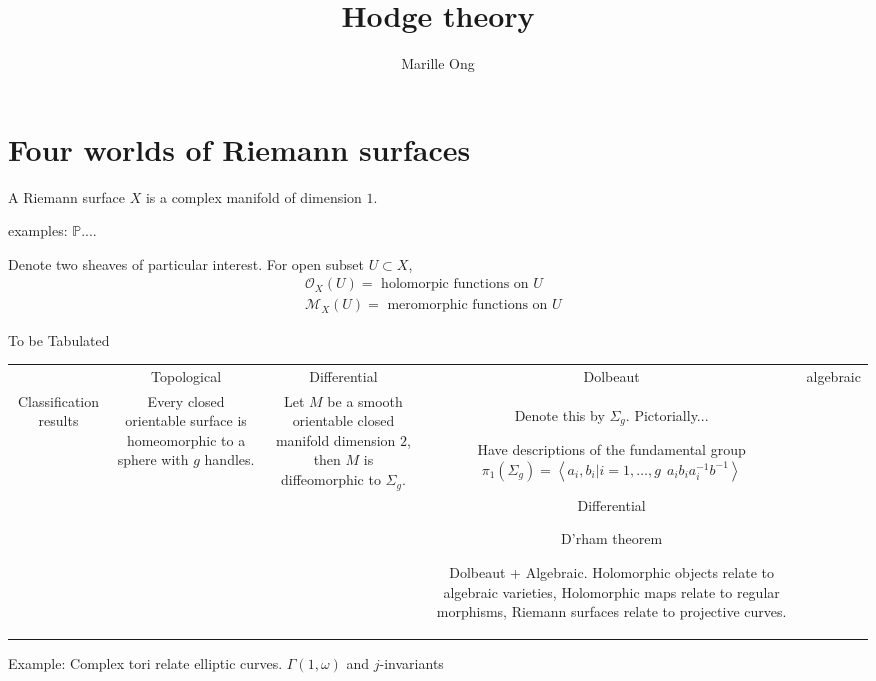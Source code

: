 % 


\title{Hodge theory}
\author{Marille Ong}
\date{}

 
\maketitle

\section{Four worlds of Riemann surfaces} %

\begin{definition}
  A Riemann surface $X$ is a complex manifold of dimension $1$.
\end{definition}

examples:
$ \mathbb{P} $.... 

Denote two sheaves of particular interest. 
For open subset $U \subset X $, 
\begin{align}
    \mathcal{O}_X ( U) =  \mbox{ holomorpic functions on $U$ } \\
    \mathcal{M}_X ( U) =  \mbox{ meromorphic functions on $U$ } 
\end{align}

To be Tabulated 

\begin{tabular*}{\textwidth}{c|cccc}
   &   Topological  & Differential & Dolbeaut & algebraic \\
    Classification results & 
    Every closed orientable surface is homeomorphic to a sphere with $g$ handles.  & 
Let $M $ be a smooth orientable closed manifold dimension $2$, 
    then $M$ is diffeomorphic to $\Sigma _g $. & 


Denote this by $\Sigma_g$. 
Pictorially...

Have descriptions of the fundamental group
    $\pi_1 ( \Sigma_g) = \left< a_i, b_i | i =1, \dots, g ~~ a_i b_i a_i^{-1} b^{-1} \right> $

Differential 

D'rham theorem 


Dolbeaut + Algebraic.
Holomorphic objects relate to algebraic varieties, 
Holomorphic maps relate to regular morphisms, 
Riemann surfaces relate to projective curves. 
\end{tabular*} 

Example: Complex tori relate elliptic curves. 
$ \Gamma( 1, \omega) $  and $j$-invariants 


